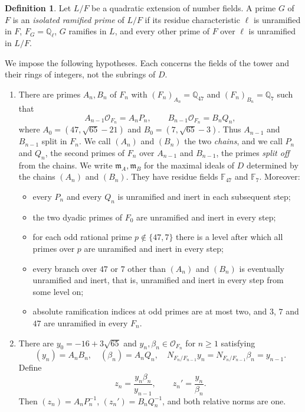 \documentclass[11pt]{article}
\theoremstyle{plain}
\theoremstyle{definition}
\newtheorem{definition}[theorem]{Definition}
\theoremstyle{remark}
\newcommand{\Q}{\mathbb Q}
\newcommand{\F}{\mathbb F}
\newcommand{\OO}{\mathcal O}
\newcommand{\EA}{\mathfrak m_A}
\newcommand{\EB}{\mathfrak m_B}
\begin{document}
\begin{definition}\label{def:isolated}
Let $L/F$ be a quadratic extension of number fields.  A prime $G$ of $F$
is an \emph{isolated ramified prime} of $L/F$ if its residue
characteristic $\ell$ is unramified in $F$, $F_G=\Q_\ell$, $G$ ramifies in
$L$, and every other prime of $F$ over $\ell$ is unramified in $L/F$.
\end{definition}

We impose the following hypotheses.  Each concerns the fields of the
tower and their rings of integers, not the subrings of $D$.
\begin{enumerate}
\item[\textup{(T1)}] There are primes $A_n,B_n$ of $F_n$ with
$(F_n)_{A_n}=\Q_{47}$ and $(F_n)_{B_n}=\Q_7$ such that
\[
 A_{n-1}\OO_{F_n}=A_nP_n,\qquad
 B_{n-1}\OO_{F_n}=B_nQ_n,
\]
where $A_0=(47,\sqrt{65}-21)$ and $B_0=(7,\sqrt{65}-3)$.  Thus $A_{n-1}$
and $B_{n-1}$ split in $F_n$.  We call $(A_n)$ and $(B_n)$ the two
\emph{chains}, and we call $P_n$ and $Q_n$, the second primes of $F_n$
over $A_{n-1}$ and $B_{n-1}$, the primes \emph{split off} from the chains.
We write $\EA,\EB$ for the maximal ideals of $D$ determined by the chains
$(A_n)$ and $(B_n)$.  They have residue fields $\F_{47}$ and $\F_7$.
Moreover:
\begin{itemize}
\item every $P_n$ and every $Q_n$ is unramified and inert in each
subsequent step;
\item the two dyadic primes of $F_0$ are unramified and inert in every
step;
\item for each odd rational prime $p\notin\{47,7\}$ there is a level after
which all primes over $p$ are unramified and inert in every step;
\item every branch over $47$ or $7$ other than $(A_n)$ and $(B_n)$ is
eventually unramified and inert, that is, unramified and inert in every
step from some level on;
\item absolute ramification indices at odd primes are at most two, and
$3$, $7$ and $47$ are unramified in every $F_n$.
\end{itemize}

\item[\textup{(T2)}] There are $y_0=-16+3\sqrt{65}$ and
$y_n,\beta_n\in\OO_{F_n}$ for $n\geq1$ satisfying
\[
 (y_n)=A_nB_n,\quad (\beta_n)=A_nQ_n,\quad
 N_{F_n/F_{n-1}}y_n=N_{F_n/F_{n-1}}\beta_n=y_{n-1}.
\]
Define
\begin{equation}\label{eq:siblings}
 z_n=\frac{y_n\beta_n}{y_{n-1}},\qquad
 z_n'=\frac{y_n}{\beta_n}.
\end{equation}
Then $(z_n)=A_nP_n^{-1}$, $(z_n')=B_nQ_n^{-1}$, and both relative norms
are one.


\end{enumerate}
\end{document}
